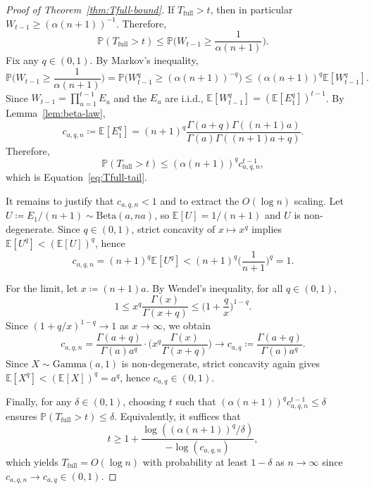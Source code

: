 \documentclass{uai2026} %
\newcommand{\1}{\mathbf{1}}
\newcommand{\prob}{\mathbb{P}}
\newcommand{\expec}{\mathbb{E}}
\begin{document}
\begin{proof}[Proof of Theorem~\ref{thm:Tfull-bound}]
  If $T_{\mathrm{full}}>t$, then in particular $W_{t-1}\ge (\alpha(n+1))^{-1}$.
  Therefore,
  \begin{equation*}
    \prob(T_{\mathrm{full}}>t)
    \le \prob\Big(W_{t-1}\ge \frac{1}{\alpha(n+1)}\Big).
  \end{equation*}
  Fix any $q\in(0,1)$.
  By Markov's inequality,
  \begin{equation*}
    \prob\Big(W_{t-1}\ge \frac{1}{\alpha(n+1)}\Big)
    =\prob\Big(W_{t-1}^q\ge (\alpha(n+1))^{-q}\Big)
    \le (\alpha(n+1))^{q} \expec[W_{t-1}^q].
  \end{equation*}
  Since $W_{t-1}=\prod_{u=1}^{t-1} E_{u}$ and the $E_{u}$ are i.i.d., $\expec[W_{t-1}^q]=(\expec[E_{1}^q])^{t-1}$.
  By Lemma~\ref{lem:beta-law},
  \begin{equation*}
    c_{a,q,n}\coloneqq \expec[E_{1}^q]
    =(n+1)^q\frac{\Gamma(a+q)\Gamma((n+1)a)}{\Gamma(a)\Gamma((n+1)a+q)}.
  \end{equation*}
  Therefore,
  \begin{equation*}
    \prob(T_{\mathrm{full}}>t)\le (\alpha(n+1))^{q} c_{a,q,n}^{t-1},
  \end{equation*}
  which is Equation~\eqref{eq:Tfull-tail}.

  It remains to justify that $c_{a,q,n}<1$ and to extract the $O(\log n)$ scaling.
  Let $U\coloneqq E_{1}/(n+1)\sim\mathrm{Beta}(a,na)$, so $\expec[U]=1/(n+1)$ and $U$ is non-degenerate.
  Since $q\in(0,1)$, strict concavity of $x\mapsto x^q$ implies $\expec[U^q]<(\expec[U])^q$, hence
  \begin{equation*}
    c_{a,q,n}
    =(n+1)^q\expec[U^q]
    < (n+1)^q\Big(\frac{1}{n+1}\Big)^q
    =1.
  \end{equation*}

  For the limit, let $x\coloneqq (n+1)a$.
  By Wendel's inequality, for all $q\in(0,1)$,
  \begin{equation*}
    1
    \le x^q\frac{\Gamma(x)}{\Gamma(x+q)}
    \le \Big(1+\frac{q}{x}\Big)^{1-q}.
  \end{equation*}
  Since $(1+q/x)^{1-q}\to 1$ as $x\to\infty$, we obtain
  \begin{equation*}
    c_{a,q,n}
    =\frac{\Gamma(a+q)}{\Gamma(a)a^q}\cdot \Big(x^q\frac{\Gamma(x)}{\Gamma(x+q)}\Big)
    \to c_{a,q}\coloneqq \frac{\Gamma(a+q)}{\Gamma(a)a^q}.
  \end{equation*}
  Since $X\sim\mathrm{Gamma}(a,1)$ is non-degenerate, strict concavity again gives $\expec[X^q]<(\expec[X])^q=a^q$, hence $c_{a,q}\in(0,1)$.

  Finally, for any $\delta\in(0,1)$, choosing $t$ such that $(\alpha(n+1))^{q} c_{a,q,n}^{t-1}\le \delta$ ensures $\prob(T_{\mathrm{full}}>t)\le \delta$.
  Equivalently, it suffices that
  \begin{equation*}
    t
    \ge 1+\frac{\log((\alpha(n+1))^q/\delta)}{-\log(c_{a,q,n})},
  \end{equation*}
  which yields $T_{\mathrm{full}}=O(\log n)$ with probability at least $1-\delta$ as $n\to\infty$ since $c_{a,q,n}\to c_{a,q}\in(0,1)$.
\end{proof}
\end{document}
